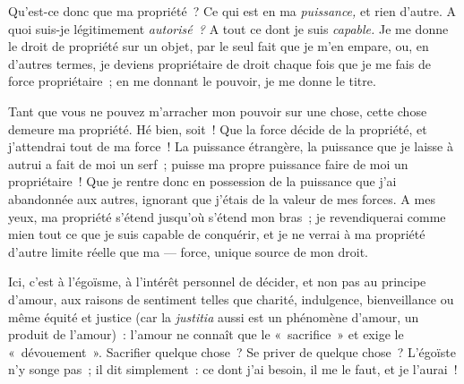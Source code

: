 \documentclass[french,twoside]{book} %
\begin{document}
Qu’est-ce donc que ma propriété ? Ce qui est en  ma \emph{puissance,} et rien d’autre. A quoi suis-je légitimement \emph{autorisé ?} A tout ce dont je suis \emph{capable.} Je me donne le droit de propriété sur un objet, par le seul fait que je m’en empare, ou, en d’autres termes, je deviens propriétaire de droit chaque fois que je me fais de force propriétaire ; en me donnant le pouvoir, je me donne le titre.\par
Tant que vous ne pouvez m’arracher mon pouvoir sur une chose, cette chose demeure ma propriété. Hé bien, soit ! Que la force décide de la propriété, et j’attendrai tout de ma force ! La puissance étrangère, la puissance que je laisse à autrui a fait de moi un serf ; puisse ma propre puissance faire de moi un propriétaire ! Que je rentre donc en possession de la puissance que j’ai abandonnée aux autres, ignorant que j’étais de la valeur de mes forces. A mes yeux, ma propriété s’étend jusqu’où s’étend mon bras ; je revendiquerai comme mien tout ce que je suis capable de conquérir, et je ne verrai à ma propriété d’autre limite réelle que ma — force, unique source de mon droit.\par
Ici, c’est à l’égoïsme, à l’intérêt personnel de décider, et non pas au principe d’amour, aux raisons de sentiment telles que charité, indulgence, bienveillance ou même équité et justice (car la \emph{justitia} aussi est un phénomène d’amour, un produit de l’amour) : l’amour ne connaît que le « sacrifice » et exige le « dévouement ». Sacrifier quelque chose ? Se priver de quelque chose ? L’égoïste n’y songe pas ; il dit simplement : ce dont j’ai besoin, il me le faut, et je l’aurai !\par
\end{document}
